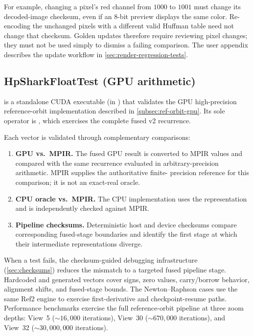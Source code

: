 For example, changing a pixel's red channel from $1000$ to $1001$ must change
its decoded-image checksum, even if an 8-bit preview displays the same color.
Re-encoding the unchanged pixels with a different valid Huffman table need not
change that checksum. Golden updates therefore require reviewing pixel changes;
they must not be used simply to dismiss a failing comparison. The user appendix
describes the update workflow in \cref{sec:render-regression-tests}.

\subsection{HpSharkFloatTest (GPU arithmetic)}
\label{subsec:hpsharkfloattest}

 is a standalone CUDA executable (in
) that validates the GPU high-precision
reference-orbit implementation described in \cref{subsec:ref-orbit-gpu}.
Its sole operator is , which exercises the complete
fused v2 recurrence.

Each vector is validated through complementary comparisons:

\begin{enumerate}
  \item \textbf{GPU vs.\ MPIR.}  The fused GPU result is converted to
        MPIR values and compared with the same recurrence evaluated in
        arbitrary-precision arithmetic. MPIR supplies the authoritative finite-
        precision reference for this comparison; it is not an exact-real oracle.
  \item \textbf{CPU oracle vs.\ MPIR.}  The CPU
         implementation uses the
         representation and is independently checked
        against MPIR.
  \item \textbf{Pipeline checksums.}  Deterministic host and device
        checksums compare corresponding fused-stage boundaries and identify
        the first stage at which their intermediate representations diverge.
\end{enumerate}

\noindent
When a test fails, the checksum-guided debugging infrastructure
(\cref{sec:checksums}) reduces the mismatch to a targeted fused pipeline
stage.  Hardcoded and generated vectors cover signs, zero values,
carry/borrow behavior, alignment shifts, and fused-stage bounds.  The
Newton--Raphson cases use the same Ref2 engine to exercise first-derivative
and checkpoint-resume paths.  Performance benchmarks exercise the full
reference-orbit pipeline at three zoom depths: View~5
(${\sim}16{,}000$ iterations), View~30 (${\sim}670{,}000$ iterations), and
View~32 (${\sim}30{,}000{,}000$ iterations).

